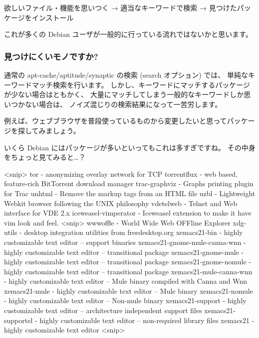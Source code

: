 \documentclass[mingoth,a4paper]{jsarticle}
\begin{document}
欲しいファイル・機能を思いつく
→
適当なキーワードで検索
→
見つけたパッケージをインストール

これが多くの Debian ユーザが一般的に行っている流れではないかと思います。

\subsubsection{見つけにくいモノですか?}

通常の apt-cache/aptitude/synaptic の検索 (search オプション) では、
単純なキーワードマッチ検索を行います。
しかし、キーワードにマッチするパッケージが少ない場合はともかく、
大量にマッチしてしまう一般的なキーワードしか思いつかない場合は、
ノイズ混じりの検索結果になって一苦労します。

例えば、ウェブブラウザを普段使っているものから変更したいと思ってパッケージを探してみましょう。


いくら Debian にはパッケージが多いといってもこれは多すぎですね。
その中身をちょっと見てみると…？

\begin{commandline}
<snip>
tor - anonymizing overlay network for TCP
torrentflux - web based, feature-rich BitTorrent download manager
trac-graphviz - Graphs printing plugin for Trac
unhtml - Remove the markup tags from an HTML file
uzbl - Lightweight Webkit browser following the UNIX philosophy
vdetelweb - Telnet and Web interface for VDE 2.x
iceweasel-vimperator - Iceweasel extension to make it have vim look and feel.
<snip>
wwwoffle - World Wide Web OFFline Explorer
xdg-utils - desktop integration utilities from freedesktop.org
xemacs21-bin - highly customizable text editor -- support binaries
xemacs21-gnome-mule-canna-wnn - highly customizable text editor -- transitional package
xemacs21-gnome-mule - highly customizable text editor -- transitional package
xemacs21-gnome-nomule - highly customizable text editor -- transitional package
xemacs21-mule-canna-wnn - highly customizable text editor -- Mule binary compiled with Canna and Wnn
xemacs21-mule - highly customizable text editor -- Mule binary
xemacs21-nomule - highly customizable text editor -- Non-mule binary
xemacs21-support - highly customizable text editor -- architecture independent support files
xemacs21-supportel - highly customizable text editor -- non-required library files
xemacs21 - highly customizable text editor
<snip>
\end{commandline}
\end{document}
